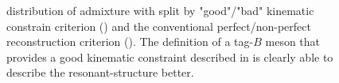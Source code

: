 \begin{figure}[htbp!]
    \centering
    \caption{\label{fig:good_tag_definitions} \Mbc distribution of \BtoXsgamma admixture with split by "good"/"bad" kinematic constrain criterion ()
    and the conventional perfect/non-perfect reconstruction criterion ().
    The definition of a tag-$B$ meson that provides a good kinematic constraint described in  is clearly able to describe the resonant-\Mbc structure better.
    }
\end{figure}